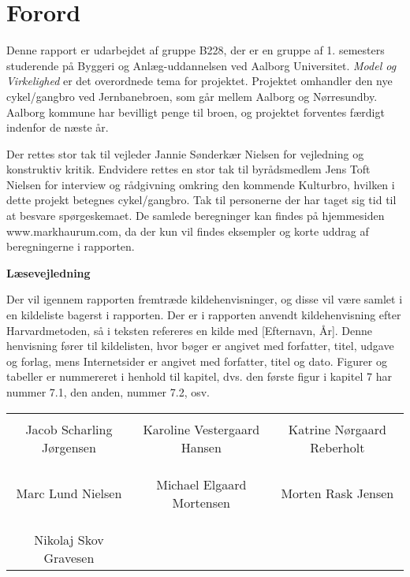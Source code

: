 \chapter*{Forord}
Denne rapport er udarbejdet af gruppe B228, der er en gruppe af 1. semesters studerende på Byggeri og Anlæg-uddannelsen ved Aalborg Universitet. \textit{Model og Virkelighed} er det overordnede tema for projektet.
Projektet omhandler den nye cykel/gangbro ved Jernbanebroen, som går mellem Aalborg og Nørresundby. Aalborg kommune har bevilligt penge til broen, og projektet forventes færdigt indenfor de næste år.

Der rettes stor tak til vejleder Jannie Sønderkær Nielsen for vejledning og konstruktiv kritik. Endvidere rettes en stor tak til byrådsmedlem Jens Toft Nielsen for interview og rådgivning omkring den kommende Kulturbro, hvilken i dette projekt betegnes cykel/gangbro. Tak til personerne der har taget sig tid til at besvare spørgeskemaet. 
De samlede beregninger kan findes på hjemmesiden www.markhaurum.com, da der kun vil findes eksempler og korte uddrag af beregningerne i rapporten.

\textbf{Læsevejledning}

Der vil igennem rapporten fremtræde kildehenvisninger, og disse vil være samlet i en kildeliste bagerst i rapporten. Der er i rapporten anvendt kildehenvisning efter Harvardmetoden, så i teksten refereres en kilde med [Efternavn, År]. Denne henvisning fører til kildelisten, hvor bøger er angivet med forfatter, titel, udgave og forlag, mens Internetsider er angivet med forfatter, titel og dato. Figurer og tabeller er nummereret i henhold til kapitel, dvs. den første figur i kapitel 7 har nummer 7.1, den anden, nummer 7.2, osv. 

\phantom{Luft}

\phantom{Luft}

\begin{table}[H]
	\centering
		\begin{tabular}{c c c}
			\underline{\phantom{mmmmmmmmmmmmmm}} & \underline{\phantom{mmmmmmmmmmmmmm}} & \underline{\phantom{mmmmmmmmmmmmmm}} \\
			Jacob Scharling Jørgensen			& Karoline Vestergaard Hansen 		& Katrine Nørgaard Reberholt 			\\
			&&\\
			&&\\
			\underline{\phantom{mmmmmmmmmmmmmm}} & \underline{\phantom{mmmmmmmmmmmmmm}} & \underline{\phantom{mmmmmmmmmmmmmm}} \\
			Marc Lund Nielsen			& Michael Elgaard Mortensen 		& Morten Rask Jensen 				\\
			&&\\
			&&\\
			\underline{\phantom{mmmmmmmmmmmmmm}} \\
			Nikolaj Skov Gravesen						
		\end{tabular}
\end{table}